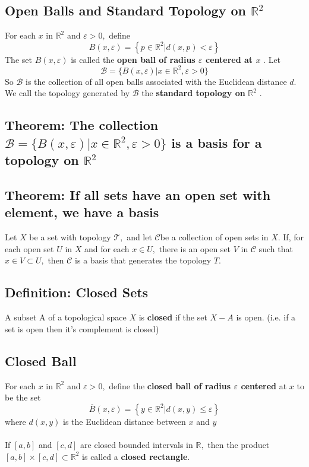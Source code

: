\documentclass[12pt]{article}
\newcommand{\R}{\mathds{R}}
\begin{document}
	\subsection{Open Balls and Standard Topology on $ \R^2 $}
		For each $x$ in $\mathbb { R } ^ { 2 }$ and $\varepsilon > 0 ,$ define
		\[B ( x , \varepsilon ) = \left\{ p \in \mathbb { R } ^ { 2 } | d ( x , p ) < \varepsilon \right\}\]
		The set $B ( x , \varepsilon )$ is called the \textbf{open ball of radius $\varepsilon$ centered at $x$ }. Let
		\[\mathcal { B } = \{ B ( x , \varepsilon ) | x \in \mathbb { R } ^ { 2 } , \varepsilon > 0 \}\]
		So $\mathcal { B }$ is the collection of all open balls associated with the Euclidean distance $ d $. We call the topology generated by $\mathcal { B }$ the \textbf{standard topology on} $\mathbb { R } ^ { 2 }$ .
	\subsection{Theorem: The collection $\mathcal { B } = \{ B ( x , \varepsilon ) | x \in \mathbb { R } ^ { 2 } , \varepsilon > 0 \}$ is a basis for a topology on $ \R^2 $ }
	\subsection{Theorem: If all sets have an open set with element, we have a basis}
		Let $X$ be a set with topology $\mathcal { T } ,$ and let $\mathcal { C }$be a collection
		of open sets in $X .$ If, for each open set $U$ in $X$ and for each $x \in U ,$ there is
		an open set $V$ in $\mathcal { C }$ such that $x \in V \subset U ,$ then $\mathcal { C }$ is a basis that generates the
		topology $T .$
	\subsection{Definition: Closed Sets}
		A subset A of a topological space $X$ is \textbf{closed} if the set $ X-A $ is open. (i.e. if a set is open then it's complement is closed)
	\subsection{Closed Ball}
		For each $x$ in $\mathbb { R } ^ { 2 }$ and $\varepsilon > 0 ,$ define the \textbf{closed ball of radius $\varepsilon$ centered} at $x$ to be the set
			\[\overline { B } ( x , \varepsilon ) = \left\{ y \in \mathbb { R } ^ { 2 } | d ( x , y ) \leq \varepsilon \right\}\]
		where $d ( x , y )$ is the Euclidean distance between $x$ and $y$\\
		\\
		If $[ a , b ]$ and $[ c , d ]$ are closed bounded intervals in $\mathbb { R } ,$ then the
		product $[ a , b ] \times [ c , d ] \subset \mathbb { R } ^ { 2 }$ is called a \textbf{closed rectangle}.
\end{document}
